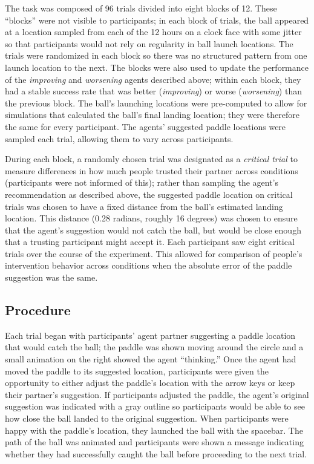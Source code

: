 \documentclass[10pt,letterpaper]{article}
\begin{document}
The task was composed of 96 trials divided into eight blocks of 12. These ``blocks'' were not visible to participants; in each block of trials, the ball appeared at a location sampled from each of the 12 hours on a clock face with some jitter so that participants would not rely on regularity in ball launch locations. The trials were randomized in each block so there was no structured pattern from one launch location to the next. The blocks were also used to update the performance of the \textit{improving} and \textit{worsening} agents described above; within each block, they had a stable success rate that was better (\textit{improving}) or worse (\textit{worsening}) than the previous block. The ball's launching locations were pre-computed to allow for simulations that calculated the ball's final landing location; they were therefore the same for every participant. The agents' suggested paddle locations were sampled each trial, allowing them to vary across participants. 

During each block, a randomly chosen trial was designated as a \textit{critical trial} to measure differences in how much people trusted their partner across conditions (participants were not informed of this); rather than sampling the agent's recommendation as described above, the suggested paddle location on critical trials was chosen to have a fixed distance from the ball's estimated landing location. This distance (0.28 radians, roughly 16 degrees) was chosen to ensure that the agent's suggestion would not catch the ball, but would be close enough that a trusting participant might accept it. Each participant saw eight critical trials over the course of the experiment. This allowed for comparison of people's intervention behavior across conditions when the absolute error of the paddle suggestion was the same. 


\subsection{Procedure}

Each trial began with participants' agent partner suggesting a paddle location that would catch the ball; the paddle was shown moving around the circle and a small animation on the right showed the agent ``thinking.'' Once the agent had moved the paddle to its suggested location, participants were given the opportunity to either adjust the paddle's location with the arrow keys or keep their partner's suggestion. If participants adjusted the paddle, the agent's original suggestion was indicated with a gray outline so participants would be able to see how close the ball landed to the original suggestion. When participants were happy with the paddle's location, they launched the ball with the spacebar. The path of the ball was animated and participants were shown a message indicating whether they had successfully caught the ball before proceeding to the next trial. 
\end{document}
